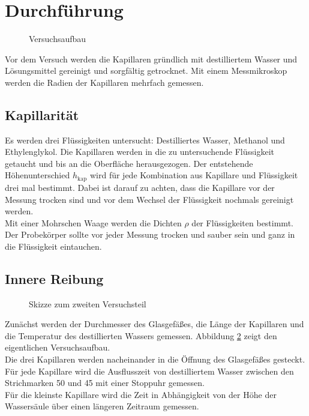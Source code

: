 \section{Durchführung}
%
\begin{figure}[!htbp]
\centering
{}
\caption{Versuchsaufbau \cite{LP:Online}}
\label{img:aufbau}
\end{figure}
%
Vor dem Versuch werden die Kapillaren gründlich mit destilliertem Wasser und Lösungsmittel gereinigt und sorgfältig getrocknet. Mit einem Messmikroskop werden die Radien der Kapillaren mehrfach gemessen.
%
\subsection{Kapillarität}
Es werden drei Flüssigkeiten untersucht: Destilliertes Wasser, Methanol und Ethylenglykol. Die Kapillaren werden in die zu untersuchende Flüssigkeit getaucht und bis an die Oberfläche herausgezogen. Der entstehende Höhenunterschied $h_{\text{kap}}$ wird für jede Kombination aus Kapillare und Flüssigkeit drei mal bestimmt. Dabei ist darauf zu achten, dass die Kapillare vor der Messung trocken sind und vor dem Wechsel der Flüssigkeit nochmals gereinigt werden.\\
Mit einer Mohrschen Waage werden die Dichten $\rho$ der Flüssigkeiten bestimmt. Der Probekörper sollte vor jeder Messung trocken und sauber sein und ganz in die Flüssigkeit eintauchen.
%
\subsection{Innere Reibung}
%
\begin{figure}[!htbp]
\centering
\resizebox{0.5\textwidth}{!}{}
\caption{Skizze zum zweiten Versuchsteil \cite{LP:Online}}
\label{img:skizze_teil2}
\end{figure}
%
Zunächst werden der Durchmesser des Glasgefäßes, die Länge der Kapillaren und die Temperatur des destillierten Wassers gemessen. Abbildung \ref{img:skizze_teil2} zeigt den eigentlichen Versuchsaufbau.\\
Die drei Kapillaren werden nacheinander in die Öffnung des Glasgefäßes gesteckt. Für jede Kapillare wird die Ausflusszeit von destilliertem Wasser zwischen den Strichmarken 50 und 45 mit einer Stoppuhr gemessen.\\
Für die kleinste Kapillare wird die Zeit in Abhängigkeit von der Höhe der Wassersäule über einen längeren Zeitraum gemessen.